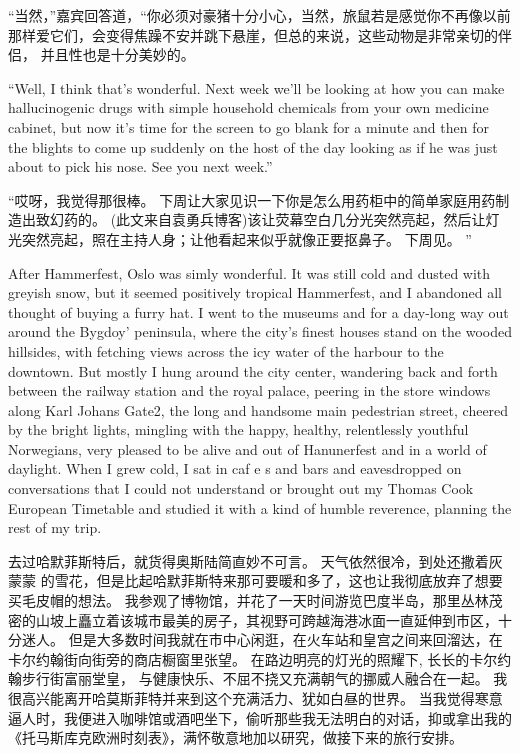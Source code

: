 \documentclass[cs4size, a4paper, 12pt]{article}
\newcounter{numpar}
\newcommand*{\newpar}{\numpar{}}
\begin{document}
	``当然，''嘉宾回答道，``你必须对豪猪十分小心，当然，旅鼠若是感觉你不再像以前 那样爱它们，会变得焦躁不安并跳下悬崖，但总的来说，这些动物是非常亲切的伴侣， 并且性也是十分美妙的。 
	
	\newpar ``Well, I think that's wonderful. Next week we'll be looking at how you can make hallucinogenic drugs with simple household chemicals from your own medicine cabinet, but now it's time for the screen to go blank for a minute and then for the blights to come up suddenly on the host of the day looking as if he was just about to pick his nose. See you next week.''
	
	``哎呀，我觉得那很棒。 下周让大家见识一下你是怎么用药柜中的简单家庭用药制造出致幻药的。 (此文来自袁勇兵博客)该让荧幕空白几分光突然亮起，然后让灯光突然亮起，照在主持人身；让他看起来似乎就像正要抠鼻子。 下周见。 ''
	
	\newpar After Hammerfest, Oslo was simly wonderful. It was still cold and dusted with greyish snow, but it seemed positively tropical Hammerfest, and I abandoned all thought of buying a furry hat. I went to the museums and for a day-long way out around the Bygdoy' peninsula, where the city's finest houses stand on the wooded hillsides, with fetching views across the icy water of the harbour to the downtown. But mostly I hung around the city center, wandering back and forth between the railway station and the royal palace, peering in the store windows along Karl Johans Gate2, the long and handsome main pedestrian street, cheered by the bright lights, mingling with the happy, healthy, relentlessly youthful Norwegians, very pleased to be alive and out of Hanunerfest and in a world of daylight. When I grew cold, I sat in caf e s and bars and eavesdropped on conversations that I could not understand or brought out my Thomas Cook European Timetable and studied it with a kind of humble reverence, planning the rest of my trip.
	
	去过哈默菲斯特后，就货得奥斯陆简直妙不可言。 天气依然很冷，到处还撒着灰蒙蒙 的雪花，但是比起哈默菲斯特来那可要暖和多了，这也让我彻底放弃了想要买毛皮帽的想法。 我参观了博物馆，并花了一天时间游览巴度半岛，那里丛林茂密的山坡上矗立着该城市最美的房子，其视野可跨越海港冰面一直延伸到市区，十分迷人。 但是大多数时间我就在市中心闲逛，在火车站和皇宫之间来回溜达，在卡尔约翰街向街旁的商店橱窗里张望。 在路边明亮的灯光的照耀下, 长长的卡尔约翰步行街富丽堂皇， 与健康快乐、不屈不挠又充满朝气的挪威人融合在一起。 我很高兴能离开哈莫斯菲特并来到这个充满活力、犹如白昼的世界。 当我觉得寒意逼人时，我便进入咖啡馆或酒吧坐下，偷听那些我无法明白的对话，抑或拿出我的《托马斯库克欧洲时刻表》，满怀敬意地加以研究，做接下来的旅行安排。 
	
\end{document}
